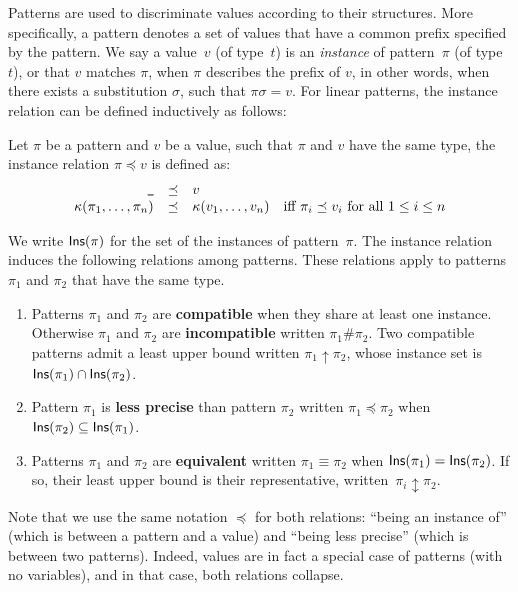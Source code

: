 \documentclass{LMCS}
\newcommand{\const}{\kappa}
\newcommand{\pt}{\pi}
\newcommand{\lessprecise}{\preceq}
\newcommand{\ins}[1]{{\sf Ins}(#1)}
\newcommand{\lubop}{\mathop{\uparrow}}
\newcommand{\lub}[2]{#1 \lubop #2}
\newcommand{\repr}[2]{#1 \mathop{\updownarrow} #2}
\renewcommand{\_}{\mathord{\rule[-.25ex]{1ex}{.15ex}}}
\begin{document}
Patterns are used to discriminate values according to their
structures. More specifically, a pattern denotes a set of values that
have a common prefix specified by the pattern. We say a value~$v$ (of
type~$t$) is an \emph{instance} of pattern~$\pt$ (of type~$t$), or
that $v$ matches $\pt$, when $\pt$ describes the prefix of $v$, in other words,
when there exists a substitution $\sigma$, such that ${\pi}{\sigma} =
v$.  For linear patterns, the instance relation can be defined
inductively as follows:
\begin{defi}[Instance]
  Let $\pt$ be a pattern and $v$ be a value, such that $\pt$ and $v$
  have the same type, the instance relation $\pt\lessprecise v$ is
  defined as:
  $$
  \begin{array}{rcll}
    \_ & \lessprecise & v & \\
    \const(\pt_1,\ldots,\pt_n)  & \lessprecise & \const(v_1,\ldots,v_n) & 
    \mbox{iff $\pt_i\lessprecise v_i$ for all $1 \leq i\leq n$}
  \end{array}
  $$
\end{defi}
\noindent We write $\ins{\pt}$ for the set of the instances of
pattern~$\pt$. The instance relation induces the following relations
among patterns. These relations apply to patterns $\pt_1$ and $\pt_2$
that have the same type.
\begin{defi} \hfill
\begin{enumerate}[$\bullet$]
\item Patterns $\pt_1$ and $\pt_2$ are {\bf compatible} when they
  share at least one instance. Otherwise $\pt_1$ and $\pt_2$ are {\bf
    incompatible} written $\pt_1 \# \pt_2$. Two compatible patterns
  admit a least upper bound written $\lub{\pt_1}{\pt_2}$, whose
  instance set is $\ins{\pt_1} \cap \ins{\pt_2}$.
\item Pattern $\pt_1$ is {\bf less precise} than pattern $\pt_2$
  written $\pt_1 \lessprecise \pt_2$ when $\ins{\pt_2} \subseteq
  \ins{\pt_1}$.
\item Patterns $\pt_1$ and $\pt_2$ are {\bf equivalent} written $\pt_1
  \equiv \pt_2$ when $\ins{\pt_1} = \ins{\pt_2}$.  If so, their least
  upper bound is their representative, written~$\repr{\pt_i}{\pt_2}$.
\end{enumerate}
\end{defi}
\noindent Note that we use the same notation $\lessprecise$ for both
relations: ``being an instance of'' (which is between a
pattern and a value) and ``being less precise'' (which is between two
patterns).
Indeed, values are in fact a special case of
patterns (with no variables), and in that case, both relations collapse.
\end{document}
